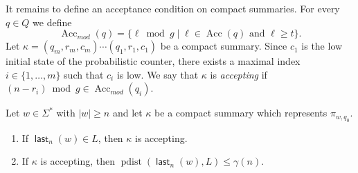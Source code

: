 \documentclass{theoretics}
\DeclareMathOperator{\last}{\mathsf{last}}
\DeclareMathOperator{\pdist}{pdist}
\DeclareMathOperator{\Acc}{Acc}
\renewcommand{\geq}{\geqslant}
\renewcommand{\leq}{\leqslant}
\renewcommand{\ge}{\geq}
\renewcommand{\le}{\leq}
\begin{document}
It remains to define an acceptance condition on compact summaries.
For every $q \in Q$ we define
\[
	\Acc_{\mathit{mod}}(q) = \{ \ell \bmod {g} \mid \ell \in \Acc(q) \text{ and } \ell \ge t\}.
\]
Let $\kappa = (q_m, r_m, c_m) \cdots (q_1, r_1, c_1)$ be a compact summary.
Since $c_1$ is the low initial state of the probabilistic counter, there exists a maximal index
$i \in \{1, \dots, m\}$ such that $c_i$ is low.
We say that $\kappa$ is {\em accepting} if $(n - r_i) \bmod g \in \Acc_{\mathit{mod}}(q_i)$.


\begin{proposition}
\label{prop:correctness}
Let $w \in \Sigma^*$ with $|w| \ge n$ and let $\kappa$ be a compact summary which represents $\pi_{w,q_0}$.
\begin{enumerate}[label=(\roman{*}), ref=(\roman{*})]
\item If $\last_n(w) \in L$, then $\kappa$ is accepting. \label{item:compact-acc}
\item If $\kappa$ is accepting, then $\pdist(\last_n(w),L) \le \gamma(n)$. \label{item:compact-rej}
\end{enumerate}
\end{proposition}
\end{document}
